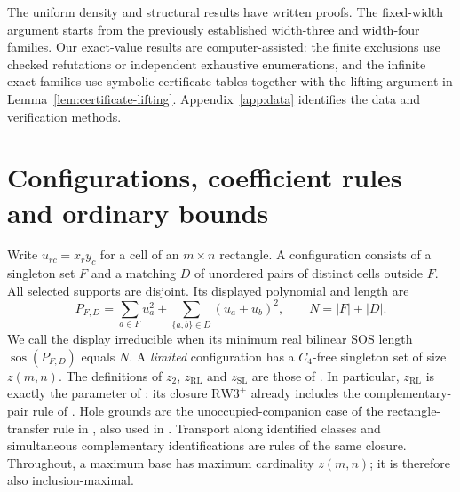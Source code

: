 \documentclass[11pt,a4paper]{article}
\theoremstyle{definition}
\newcommand{\zr}{z_{\mathrm{RL}}}
\newcommand{\zs}{z_{\mathrm{SL}}}
\newcommand{\zt}{z_2}
\newcommand{\sos}{\operatorname{sos}}
\newcommand{\RW}{\mathrm{RW3}^{+}}
\begin{document}
The uniform density and structural results have written proofs. The
fixed-width argument starts from the previously established width-three
and width-four families. Our exact-value results are computer-assisted:
the finite exclusions use checked refutations or independent exhaustive
enumerations, and the infinite exact families use symbolic certificate
tables together with the lifting argument in
Lemma~\ref{lem:certificate-lifting}. Appendix~\ref{app:data} identifies
the data and verification methods.

\section{Configurations, coefficient rules and ordinary bounds}
\label{sec:prelim}

Write $u_{rc}=x_ry_c$ for a cell of an $m\times n$ rectangle.
A configuration consists of a singleton set $F$ and a matching $D$ of
unordered pairs of distinct cells outside $F$. All selected supports are
disjoint. Its displayed polynomial and length are
\begin{equation}\label{eq:display}
 P_{F,D}=\sum_{a\in F}u_a^2+
            \sum_{\{a,b\}\in D}(u_a+u_b)^2,
 \qquad N=|F|+|D|.
\end{equation}
We call the display irreducible when its minimum real bilinear SOS
length $\sos(P_{F,D})$ equals $N$. A \emph{limited} configuration has a
$C_4$-free singleton set of size $z(m,n)$. The definitions of $\zt$,
$\zr$ and $\zs$ are those of \cite[Definitions~3.1, 4.11, 7.3]{LQ}.
In particular, $\zr$ is exactly the parameter of
\cite[Definition~4.11]{LQ}: its closure $\RW$ already includes the
complementary-pair rule of \cite[Definition~4.5]{LQ}. Hole grounds
are the unoccupied-companion case of the rectangle-transfer rule in
\cite[Definition~4.1]{LQ}, also used in \cite[Lemma~4.8]{LQ}.
Transport along identified classes and simultaneous complementary
identifications are rules of the same closure. Throughout, a maximum base
has maximum cardinality $z(m,n)$; it is therefore also inclusion-maximal.
\end{document}
